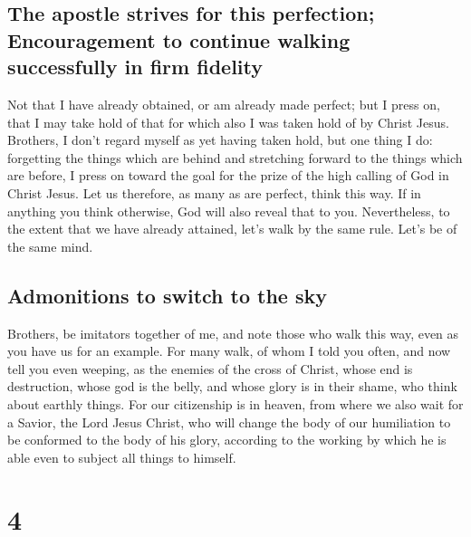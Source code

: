 \hypertarget{the-apostle-strives-for-this-perfection-encouragement-to-continue-walking-successfully-in-firm-fidelity}{%
\subsection{The apostle strives for this perfection; Encouragement to
continue walking successfully in firm
fidelity}\label{the-apostle-strives-for-this-perfection-encouragement-to-continue-walking-successfully-in-firm-fidelity}}

 Not that I have already obtained, or am already made
perfect; but I press on, that I may take hold of that for which also I
was taken hold of by Christ Jesus.  Brothers, I don't
regard myself as yet having taken hold, but one thing I do: forgetting
the things which are behind and stretching forward to the things which
are before,  I press on toward the goal for the prize of
the high calling of God in Christ Jesus.  Let us
therefore, as many as are perfect, think this way. If in anything you
think otherwise, God will also reveal that to you. 
Nevertheless, to the extent that we have already attained, let's walk by
the same rule. Let's be of the same mind.

\hypertarget{admonitions-to-switch-to-the-sky}{%
\subsection{Admonitions to switch to the
sky}\label{admonitions-to-switch-to-the-sky}}

 Brothers, be imitators together of me, and note those
who walk this way, even as you have us for an example. 
For many walk, of whom I told you often, and now tell you even weeping,
as the enemies of the cross of Christ,  whose end is
destruction, whose god is the belly, and whose glory is in their shame,
who think about earthly things.  For our citizenship is
in heaven, from where we also wait for a Savior, the Lord Jesus Christ,
 who will change the body of our humiliation to be
conformed to the body of his glory, according to the working by which he
is able even to subject all things to himself.

\hypertarget{section-3}{%
\section{4}\label{section-3}}

